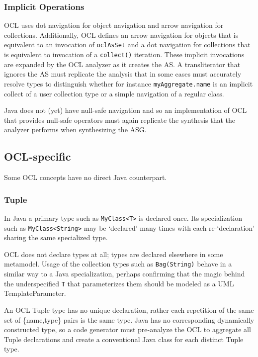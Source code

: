 \documentclass[sigconf]{acmart}
\begin{document}
\subsubsection{Implicit Operations}

OCL uses dot navigation for object navigation and arrow navigation for collections. Additionally, OCL defines an arrow navigation for objects that is equivalent to an invocation of \verb|oclAsSet| and a dot navigation for collections that is equivalent to invocation of a \verb|collect()| iteration. These implicit invocations are expanded by the OCL analyzer as it creates the AS. A transliterator that ignores the AS must replicate the analysis that in some cases must accurately resolve types to distinguish whether for instance \verb|myAggregate.name| is an implicit collect of a user collection type or a simple navigation of a regular class.

Java does not (yet) have null-safe navigation and so an implementation of OCL that provides null-safe operators \cite{Willink2015} must again replicate the synthesis that the analyzer performs when synthesizing the ASG.  

\subsection{OCL-specific}

Some OCL concepts have no direct Java counterpart.

\subsubsection{Tuple}

In Java a primary type such as \verb|MyClass<T>| is declared once. Its specialization such as \verb|MyClass<String>| may be `declared' many times with each re-`declaration' sharing  the same specialized type.

OCL does not declare types at all; types are declared elsewhere in some metamodel. Usage of the collection types such as \verb|Bag(String)| behave in a similar way to a Java specialization, perhaps confirming that the magic behind the underspecified \verb|T| that parameterizes them should be modeled as a UML TemplateParameter. %

An OCL Tuple type has no unique declaration, rather each repetition of the same  set of \{name,type\} pairs is the same type. Java has no corresponding dynamically constructed type, so a code generator must pre-analyze the OCL to aggregate all Tuple declarations and create a conventional Java class for each distinct Tuple type.
\end{document}
